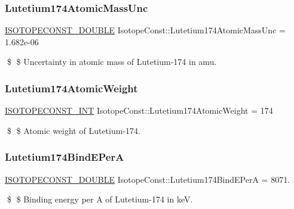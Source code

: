 \subsubsection{\texorpdfstring{Lutetium174\+Atomic\+Mass\+Unc}{Lutetium174AtomicMassUnc}}
{\footnotesize\ttfamily \mbox{\hyperlink{group___isotope_const-_macros_ga8f45a7272ce02c0b4c65c44636ed719a}{I\+S\+O\+T\+O\+P\+E\+C\+O\+N\+S\+T\+\_\+\+D\+O\+U\+B\+LE}} Isotope\+Const\+::\+Lutetium174\+Atomic\+Mass\+Unc = 1.\+682e-\/06}

\$ \$ Uncertainty in atomic mass of Lutetium-\/174 in amu. \mbox{\label{group___isotope_const-_lutetium-_lu174_ga4aaf4a98f3da92d29ae25affb38d2c0f}} 
\subsubsection{\texorpdfstring{Lutetium174\+Atomic\+Weight}{Lutetium174AtomicWeight}}
{\footnotesize\ttfamily \mbox{\hyperlink{group___isotope_const-_macros_ga5f18360b3e99483a35c32d789e62621c}{I\+S\+O\+T\+O\+P\+E\+C\+O\+N\+S\+T\+\_\+\+I\+NT}} Isotope\+Const\+::\+Lutetium174\+Atomic\+Weight = 174}

\$ \$ Atomic weight of Lutetium-\/174. \mbox{\label{group___isotope_const-_lutetium-_lu174_ga5eb85d8c8859e283fddeea1da5b49866}} 
\subsubsection{\texorpdfstring{Lutetium174\+Bind\+E\+PerA}{Lutetium174BindEPerA}}
{\footnotesize\ttfamily \mbox{\hyperlink{group___isotope_const-_macros_ga8f45a7272ce02c0b4c65c44636ed719a}{I\+S\+O\+T\+O\+P\+E\+C\+O\+N\+S\+T\+\_\+\+D\+O\+U\+B\+LE}} Isotope\+Const\+::\+Lutetium174\+Bind\+E\+PerA = 8071.}

\$ \$ Binding energy per A of Lutetium-\/174 in keV. \mbox{\label{group___isotope_const-_lutetium-_lu174_ga8e13ad33f34d38745529c7d496bad4f6}} 
